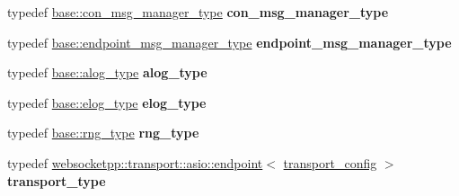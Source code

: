 \begin{DoxyCompactItemize}
\item 
typedef \hyperlink{classwebsocketpp_1_1message__buffer_1_1alloc_1_1con__msg__manager}{base\+::con\+\_\+msg\+\_\+manager\+\_\+type} {\bfseries con\+\_\+msg\+\_\+manager\+\_\+type}\hypertarget{structwebsocketpp_1_1config_1_1debug__asio__tls_a6ccadcf2290d1c3cb58a5da5e51517e1}{}\label{structwebsocketpp_1_1config_1_1debug__asio__tls_a6ccadcf2290d1c3cb58a5da5e51517e1}

\item 
typedef \hyperlink{classwebsocketpp_1_1message__buffer_1_1alloc_1_1endpoint__msg__manager}{base\+::endpoint\+\_\+msg\+\_\+manager\+\_\+type} {\bfseries endpoint\+\_\+msg\+\_\+manager\+\_\+type}\hypertarget{structwebsocketpp_1_1config_1_1debug__asio__tls_a2457bf3a910a01c162fffe78bf120cc7}{}\label{structwebsocketpp_1_1config_1_1debug__asio__tls_a2457bf3a910a01c162fffe78bf120cc7}

\item 
typedef \hyperlink{classwebsocketpp_1_1log_1_1basic}{base\+::alog\+\_\+type} {\bfseries alog\+\_\+type}\hypertarget{structwebsocketpp_1_1config_1_1debug__asio__tls_a317d8aab94f5283aa99873ce93eac381}{}\label{structwebsocketpp_1_1config_1_1debug__asio__tls_a317d8aab94f5283aa99873ce93eac381}

\item 
typedef \hyperlink{structwebsocketpp_1_1config_1_1debug__core_acfa1ded7f80d6a7276b0ec3fd0859fc3}{base\+::elog\+\_\+type} {\bfseries elog\+\_\+type}\hypertarget{structwebsocketpp_1_1config_1_1debug__asio__tls_a1f2ef75a6538ba22a7fbfa0749d3ad7e}{}\label{structwebsocketpp_1_1config_1_1debug__asio__tls_a1f2ef75a6538ba22a7fbfa0749d3ad7e}

\item 
typedef \hyperlink{structwebsocketpp_1_1config_1_1debug__core_ae59c72992beaef76957c8bfe407394e8}{base\+::rng\+\_\+type} {\bfseries rng\+\_\+type}\hypertarget{structwebsocketpp_1_1config_1_1debug__asio__tls_a31ca397251fac66cfe514e48802e3182}{}\label{structwebsocketpp_1_1config_1_1debug__asio__tls_a31ca397251fac66cfe514e48802e3182}

\item 
typedef \hyperlink{classwebsocketpp_1_1transport_1_1asio_1_1endpoint}{websocketpp\+::transport\+::asio\+::endpoint}$<$ \hyperlink{structwebsocketpp_1_1config_1_1debug__asio__tls_1_1transport__config}{transport\+\_\+config} $>$ {\bfseries transport\+\_\+type}\hypertarget{structwebsocketpp_1_1config_1_1debug__asio__tls_a9c9369aef0a393f0293d8a4a6192aaff}{}\label{structwebsocketpp_1_1config_1_1debug__asio__tls_a9c9369aef0a393f0293d8a4a6192aaff}

\end{DoxyCompactItemize}
